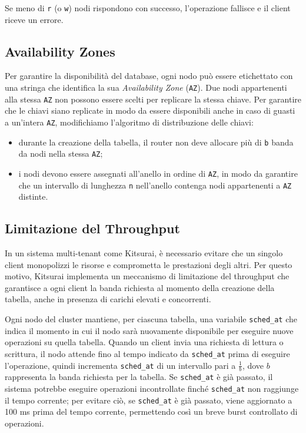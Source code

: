 Se meno di \texttt{r} (o \texttt{w}) nodi rispondono con successo, l'operazione fallisce e il client riceve un errore.

\subsection{Availability Zones}
\label{subsec:availability-zones}

Per garantire la disponibilità del database, ogni nodo può essere etichettato con una stringa che identifica la sua \emph{Availability Zone} (\texttt{AZ}).
Due nodi appartenenti alla stessa \texttt{AZ} non possono essere scelti per replicare la stessa chiave.
Per garantire che le chiavi siano replicate in modo da essere disponibili anche in caso di guasti a un'intera \texttt{AZ}, modifichiamo l'algoritmo di distribuzione delle chiavi:
\begin{itemize}
    \item durante la creazione della tabella, il router non deve allocare più di \texttt{b} banda da nodi nella stessa \texttt{AZ};
    \item i nodi devono essere assegnati all'anello in ordine di \texttt{AZ}, in modo da garantire che un intervallo di lunghezza \texttt{n} nell'anello contenga nodi appartenenti a \texttt{AZ} distinte.
\end{itemize}

\subsection{Limitazione del Throughput}
\label{subsec:limitazione-throughput}

In un sistema multi-tenant come Kitsurai, è necessario evitare che un singolo client monopolizzi le risorse e comprometta le prestazioni degli altri.
Per questo motivo, Kitsurai implementa un meccanismo di limitazione del throughput che garantisce a ogni client la banda richiesta al momento della creazione della tabella, anche in presenza di carichi elevati e concorrenti.

Ogni nodo del cluster mantiene, per ciascuna tabella, una variabile \texttt{sched\_at} che indica il momento in cui il nodo sarà nuovamente disponibile per eseguire nuove operazioni su quella tabella.
Quando un client invia una richiesta di lettura o scrittura, il nodo attende fino al tempo indicato da \texttt{sched\_at} prima di eseguire l'operazione, quindi incrementa \texttt{sched\_at} di un intervallo pari a $\displaystyle \frac{1}{b}$, dove $b$ rappresenta la banda richiesta per la tabella.
Se \texttt{sched\_at} è già passato, il sistema potrebbe eseguire operazioni incontrollate finché \texttt{sched\_at} non raggiunge il tempo corrente; per evitare ciò, se \texttt{sched\_at} è già passato, viene aggiornato a 100 ms prima del tempo corrente, permettendo così un breve burst controllato di operazioni.

